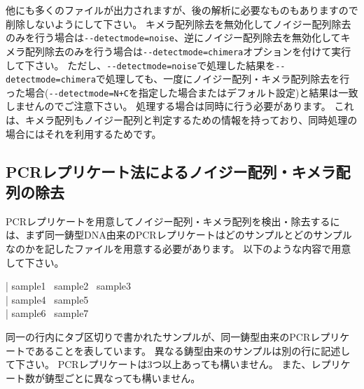\documentclass[titlepage,10pt,a4paper]{jsbook}
\newenvironment{content}{\begin{shaded}\vspace{-1em}\raggedright\ttfamily\footnotesize\setlength{\baselineskip}{1.4em}}{\end{shaded}\vspace{-1em}}
\begin{document}
他にも多くのファイルが出力されますが、後の解析に必要なものもありますので削除しないようにして下さい。
キメラ配列除去を無効化してノイジー配列除去のみを行う場合は\texttt{{-}{-}detectmode=noise}、逆にノイジー配列除去を無効化してキメラ配列除去のみを行う場合は\texttt{{-}{-}detectmode=chimera}オプションを付けて実行して下さい。
ただし、\texttt{{-}{-}detectmode=noise}で処理した結果を\texttt{{-}{-}detectmode=chimera}で処理しても、一度にノイジー配列・キメラ配列除去を行った場合(\texttt{{-}{-}detectmode=N+C}を指定した場合またはデフォルト設定)と結果は一致しませんのでご注意下さい。
処理する場合は同時に行う必要があります。
これは、キメラ配列もノイジー配列と判定するための情報を持っており、同時処理の場合にはそれを利用するためです。

\subsection{PCRレプリケート法によるノイジー配列・キメラ配列の除去}

PCRレプリケートを用意してノイジー配列・キメラ配列を検出・除去するには、まず同一鋳型DNA由来のPCRレプリケートはどのサンプルとどのサンプルなのかを記したファイルを用意する必要があります。
以下のような内容で用意して下さい。
\begin{content}
| sample1~ sample2~ sample3\\
| sample4~ sample5\\
| sample6~ sample7
\end{content}
同一の行内にタブ区切りで書かれたサンプルが、同一鋳型由来のPCRレプリケートであることを表しています。
異なる鋳型由来のサンプルは別の行に記述して下さい。
PCRレプリケートは3つ以上あっても構いません。
また、レプリケート数が鋳型ごとに異なっても構いません。
\end{document}
